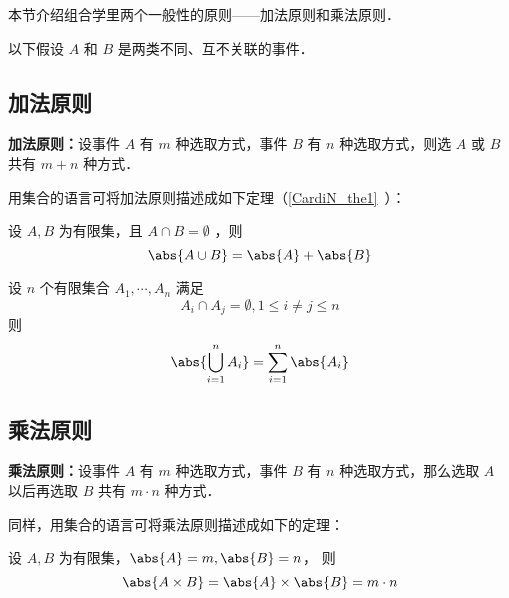 
本节介绍组合学里两个一般性的原则——加法原则和乘法原则．

以下假设 $A$ 和 $B$ 是两类不同、互不关联的事件．
\subsection{加法原则}
\textbf{加法原则：}设事件 $A$ 有 $m$ 种选取方式，事件 $B$ 有 $n$ 种选取方式，则选 $A$ 或 $B$ 共有 $m+n$ 种方式．

用集合的语言可将加法原则描述成如下定理（\autoref{CardiN_the1}~）：
\begin{theorem}{}
设 $A,B$ 为有限集，且 $A\cap B=\emptyset$ ，则
\begin{equation}
\abs{A\cup B}=\abs{A}+\abs{B}
\end{equation}
\end{theorem}
\begin{corollary}{}
设 $n$ 个有限集合 $A_1,\cdots,A_n$ 满足
\begin{equation}
A_i\cap A_j=\emptyset,1\leq i\neq j\leq n
\end{equation}
则
\begin{equation}
\abs{\bigcup_{i=1}^n A_i}=\sum_{i=1}^n\abs{A_i}
\end{equation}

\end{corollary}
\subsection{乘法原则}
\textbf{乘法原则：}设事件 $A$ 有 $m$ 种选取方式，事件 $B$ 有 $n$ 种选取方式，那么选取 $A$ 以后再选取 $B$ 共有 $m\cdot n$ 种方式．

同样，用集合的语言可将乘法原则描述成如下的定理：
\begin{theorem}{}
设 $A,B$ 为有限集，$\abs{A}=m,\abs{B}=n$， 则
\begin{equation}
\abs{A\times B}=\abs{A}\times\abs{B}=m\cdot n
\end{equation}

\end{theorem}
